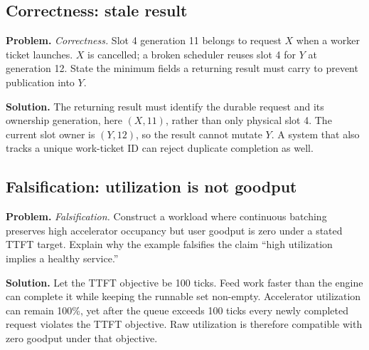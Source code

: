 \subsection{Correctness: stale result}
\textbf{Problem.} \emph{Correctness.} Slot 4 generation 11 belongs to request $X$ when a
worker ticket launches. $X$ is cancelled; a broken scheduler reuses slot 4
for $Y$ at generation 12. State the minimum fields a returning result must
carry to prevent publication into $Y$.

\textbf{Solution.} The returning result must identify the durable request and its ownership
generation, here $(X,11)$, rather than only physical slot 4. The current slot
owner is $(Y,12)$, so the result cannot mutate $Y$. A system that also tracks
a unique work-ticket ID can reject duplicate completion as well.

\subsection{Falsification: utilization is not goodput}
\textbf{Problem.} \emph{Falsification.} Construct a workload where continuous batching
preserves high accelerator occupancy but user goodput is zero under a stated
TTFT target. Explain why the example falsifies the claim ``high utilization
implies a healthy service.''

\textbf{Solution.} Let the TTFT objective be 100 ticks. Feed work faster than the engine can
complete it while keeping the runnable set non-empty. Accelerator utilization
can remain 100\%, yet after the queue exceeds 100 ticks every newly completed
request violates the TTFT objective. Raw utilization is therefore compatible
with zero goodput under that objective.
